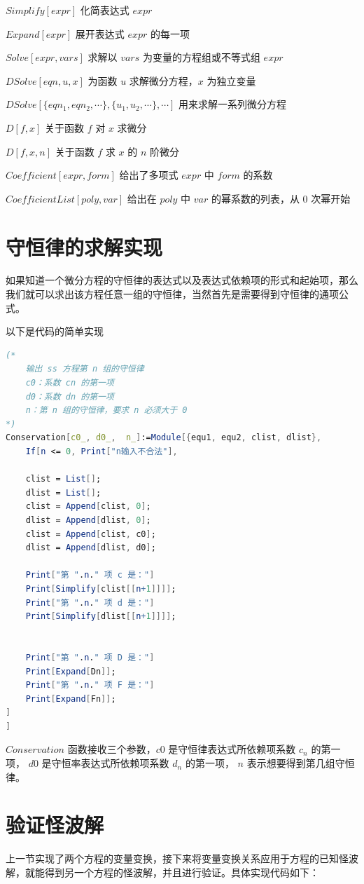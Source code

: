 $Simplify[expr]$  \quad   化简表达式 $expr$

$Expand[expr]$ \quad    展开表达式 $expr$ 的每一项

$Solve[expr, vars]$  \quad 求解以 $vars$ 为变量的方程组或不等式组 $expr$

$DSolve[eqn, u, x]$ \quad  为函数 $u$ 求解微分方程，$x$ 为独立变量

$DSolve[\{eqn_1, eqn_2, \cdots \}, \{u_1, u_2, \cdots \}, \cdots ]$ \quad  用来求解一系列微分方程

$D[f,x]$     \quad  关于函数 $f$ 对 $x$ 求微分

$D[f,{x,n}]$     \quad     关于函数 $f$ 求 $x$ 的 $n$ 阶微分

$Coefficient[expr, form]$   \quad  给出了多项式 $expr$ 中 $form$ 的系数

$CoefficientList[poly, var]$   \quad  给出在 $poly$ 中 $var$ 的幂系数的列表，从 0 次幂开始

\section{守恒律的求解实现}
如果知道一个微分方程的守恒律的表达式以及表达式依赖项的形式和起始项，那么我们就可以求出该方程任意一组的守恒律，当然首先是需要得到守恒律的通项公式。

以下是代码的简单实现
\begin{lstlisting}[language=Mathematica,caption=守恒律求解的实现]
(*
	输出 ss 方程第 n 组的守恒律
	c0：系数 cn 的第一项
	d0：系数 dn 的第一项
	n：第 n 组的守恒律，要求 n 必须大于 0
*)
Conservation[c0_, d0_,  n_]:=Module[{equ1, equ2, clist, dlist},
	If[n <= 0, Print["n输入不合法"],
	
	clist = List[];
	dlist = List[];
	clist = Append[clist, 0];
	dlist = Append[dlist, 0];
	clist = Append[clist, c0];
	dlist = Append[dlist, d0];
	
	Print["第 ".n." 项 c 是："]
	Print[Simplify[clist[[n+1]]]];
	Print["第 ".n." 项 d 是："]
	Print[Simplify[dlist[[n+1]]]];

	
	Print["第 ".n." 项 D 是："]
	Print[Expand[Dn]];
	Print["第 ".n." 项 F 是："]
	Print[Expand[Fn]];
]
]

\end{lstlisting}
$Conservation$ 函数接收三个参数，$c0$ 是守恒律表达式所依赖项系数 $c_n$ 的第一项， $d0$ 是守恒率表达式所依赖项系数 $d_n$ 的第一项， $n$ 表示想要得到第几组守恒律。 


\section{验证怪波解}
上一节实现了两个方程的变量变换，接下来将变量变换关系应用于方程的已知怪波解，就能得到另一个方程的怪波解，并且进行验证。具体实现代码如下：

